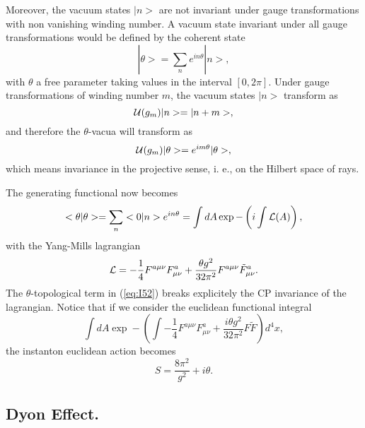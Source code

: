Moreover, the vacuum states $|n>$ are not invariant under gauge
transformations with non vanishing winding number. A vacuum state
invariant under all gauge transformations would be defined by the
coherent state
\begin{equation}
|\theta> = \sum_{n}e^{in \theta}|n>,
\label{eq:I50}
\end{equation}
with $\theta$ a free parameter taking values in the interval
$[0,2\pi]$. Under gauge transformations of
winding number $m$, the vacuum states $|n>$ transform as
\begin{equation}
{\cal U}(g_m) |n> = | n+m>, 
\end{equation}
and therefore the $\theta$-vacua will transform as 
\begin{equation}
{\cal U}(g_m) |\theta> = e^{im \theta }|\theta>, 
\end{equation}
which means invariance in the projective sense, i. e., on the
Hilbert space of rays. 
  
The generating functional now becomes
\begin{equation}
<\theta|\theta> = \sum_n <0 |n>e^{in \theta} = \int dA \exp -
\left( i \int {\cal L}(A) \right),
\label{eq:I51}
\end{equation}
with the Yang-Mills lagrangian
\begin{equation}
{\cal L} = - \frac {1}{4} F^{a \mu \nu} F^{a}_{\mu \nu} + \frac
{\theta g^2}{32 \pi^2} F^{a \mu \nu} \tilde{F}^{a}_{ \mu \nu}.
\label{eq:I52}
\end{equation}
The $\theta$-topological term in (\ref{eq:I52}) breaks
explicitely the CP invariance of the lagrangian. Notice
that if we consider the euclidean functional integral
\begin{equation}
\int dA \exp - \left( \int - \frac {1}{4}F^{a \mu \nu}F^{a}_{\mu \nu} + \frac {i \theta
g^2}{32 \pi^2} F \tilde{F} \right) d^4x, 
\end{equation}
the instanton euclidean action becomes
\begin{equation}
S= \frac {8 \pi^2}{g^2} + i \theta. 
\end{equation}



\subsection{Dyon Effect.}

